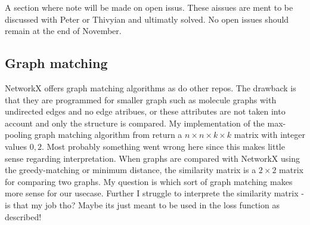A section where note will be made on open issus. These aissues are ment to be discussed with Peter or Thivyian and ultimatly solved. No open issues should remain at the end of November.


\subsection{Graph matching}

NetworkX offers graph matching algorithms as do other repos. The drawback is that they are programmed for smaller graph such as molecule graphs with undirected edges and no edge atribues, or these attributes are not taken into account and only the structure is compared.
My implementation of the max-pooling graph matching algorithm from \cite{simonovsky_graphvae_2018} return a $n\times n\times k\times k$ matrix with integer values ${0,2}$. Most probably something went wrong here since this makes little sense regarding interpretation.
When graphs are compared with NetworkX using the greedy-matching or minimum distance, the similarity matrix is a $2\times 2$ matrix for comparing two graphs.
My question is which sort of graph matching makes more sense for our usecase.
Further I struggle to interprete the similarity matrix - is that my job tho? Maybe its just meant to be used in the loss function as described! 